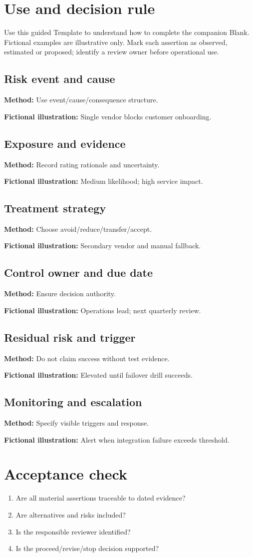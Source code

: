 \documentclass[11pt]{article}
\begin{document}
\SuiteOpen
\section{Use and decision rule}
Use this guided Template to understand how to complete the companion Blank. Fictional examples are illustrative only. Mark each assertion as observed, estimated or proposed; identify a review owner before operational use.
\subsection*{Risk event and cause}
\textbf{Method:} Use event/cause/consequence structure.\par\textbf{Fictional illustration:} Single vendor blocks customer onboarding.\par
\subsection*{Exposure and evidence}
\textbf{Method:} Record rating rationale and uncertainty.\par\textbf{Fictional illustration:} Medium likelihood; high service impact.\par
\subsection*{Treatment strategy}
\textbf{Method:} Choose avoid/reduce/transfer/accept.\par\textbf{Fictional illustration:} Secondary vendor and manual fallback.\par
\subsection*{Control owner and due date}
\textbf{Method:} Ensure decision authority.\par\textbf{Fictional illustration:} Operations lead; next quarterly review.\par
\subsection*{Residual risk and trigger}
\textbf{Method:} Do not claim success without test evidence.\par\textbf{Fictional illustration:} Elevated until failover drill succeeds.\par
\subsection*{Monitoring and escalation}
\textbf{Method:} Specify visible triggers and response.\par\textbf{Fictional illustration:} Alert when integration failure exceeds threshold.\par
\section{Acceptance check}
\begin{enumerate}[leftmargin=*,itemsep=5pt]
\item Are all material assertions traceable to dated evidence?
\item Are alternatives and risks included?
\item Is the responsible reviewer identified?
\item Is the proceed/revise/stop decision supported?
\end{enumerate}
\end{document}
